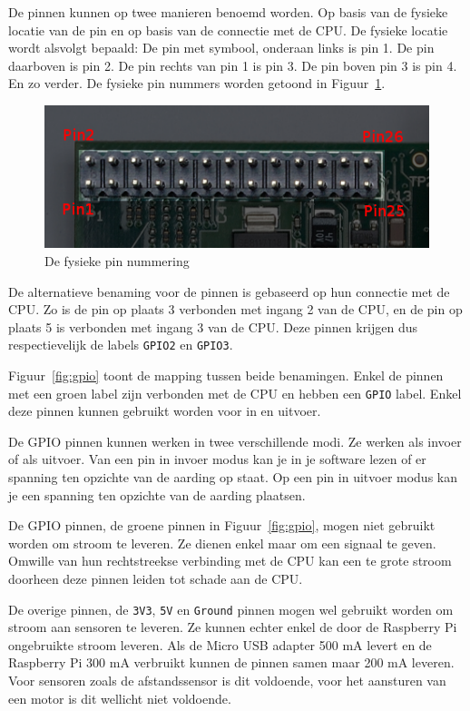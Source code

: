 \documentclass[a4paper]{article}
\begin{document}
      De pinnen kunnen op twee manieren benoemd worden.  Op basis van
de fysieke locatie van de pin en op basis van de connectie met de CPU.
De fysieke locatie wordt alsvolgt bepaald: De pin met symbool, 
onderaan links is pin 1. De pin daarboven is pin 2.  De pin rechts van
pin 1 is pin 3.  De pin boven pin 3 is pin 4.  En zo verder.  De
fysieke pin nummers worden getoond in Figuur~\ref{fig:gpio:physical}.

      \begin{figure}[h!]
        \centering
        \includegraphics[width=.8\textwidth]{images/gpio-physical.png}
        \caption{De fysieke pin nummering}
        \label{fig:gpio:physical}
      \end{figure}

      De alternatieve benaming voor de pinnen is gebaseerd op hun
connectie met de CPU.  Zo is de pin op plaats 3 verbonden met ingang 2
van de CPU, en de pin op plaats 5 is verbonden met ingang 3 van de
CPU.  Deze pinnen krijgen dus respectievelijk de labels \texttt{GPIO2}
en \texttt{GPIO3}.

      Figuur~\ref{fig:gpio} toont de mapping tussen beide benamingen.
Enkel de pinnen met een groen label zijn verbonden met de CPU en
hebben een \texttt{GPIO} label.  Enkel deze pinnen kunnen gebruikt
worden voor in en uitvoer.

      De GPIO pinnen kunnen werken in twee verschillende modi.  Ze
werken als invoer of als uitvoer.  Van een pin in invoer modus kan je
in je software lezen of er spanning ten opzichte van de aarding op
staat.  Op een pin in uitvoer modus kan je een spanning ten opzichte
van de aarding plaatsen.

      De GPIO pinnen, de groene pinnen in Figuur~\ref{fig:gpio}, mogen
niet gebruikt worden om stroom te leveren.  Ze dienen enkel maar om
een signaal te geven.  Omwille van hun rechtstreekse verbinding met de
CPU kan een te grote stroom doorheen deze pinnen leiden tot schade aan
de CPU.

      De overige pinnen, de \texttt{3V3}, \texttt{5V} en
\texttt{Ground} pinnen mogen wel gebruikt worden om stroom aan
sensoren te leveren.  Ze kunnen echter enkel de door de Raspberry Pi
ongebruikte stroom leveren.  Als de Micro USB adapter 500 mA levert en
de Raspberry Pi 300 mA verbruikt kunnen de pinnen samen maar 200 mA
leveren.  Voor sensoren zoals de afstandssensor is dit voldoende, voor
het aansturen van een motor is dit wellicht niet voldoende.
\end{document}
